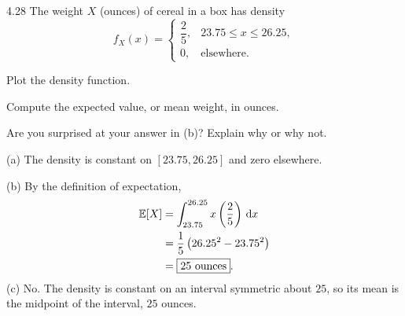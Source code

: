 \documentclass[11pt,oneside]{article}
\begin{document}
\begin{exercise}{4.28}
The weight $X$ (ounces) of cereal in a box has density
\[
    f_X(x)=\begin{cases}\dfrac25,&23.75\le x\le26.25,\\0,&\text{elsewhere}.\end{cases}
\]
\begin{exercisesubparts}
    \item Plot the density function.
    \item Compute the expected value, or mean weight, in ounces.
    \item Are you surprised at your answer in (b)? Explain why or why not.
\end{exercisesubparts}
\end{exercise}
\begin{solution}
\noindent\textup{(a)} The density is constant on $[23.75,26.25]$ and zero elsewhere.
\begin{center}
\end{center}
\medskip
\noindent\textup{(b)} By the definition of expectation,
\[
\begin{aligned}
    \mathbb{E}[X]&=\int_{23.75}^{26.25}x\left(\frac25\right)\,\mathop{}\!\mathrm{d} x\\
    &=\frac15\left(26.25^2-23.75^2\right)\\
    &=\boxed{25\text{ ounces}}.
\end{aligned}
\]
\medskip
\noindent\textup{(c)} No. The density is constant on an interval symmetric about $25$, so its mean is the midpoint of the interval, $25$ ounces.
\end{solution}
\end{document}
